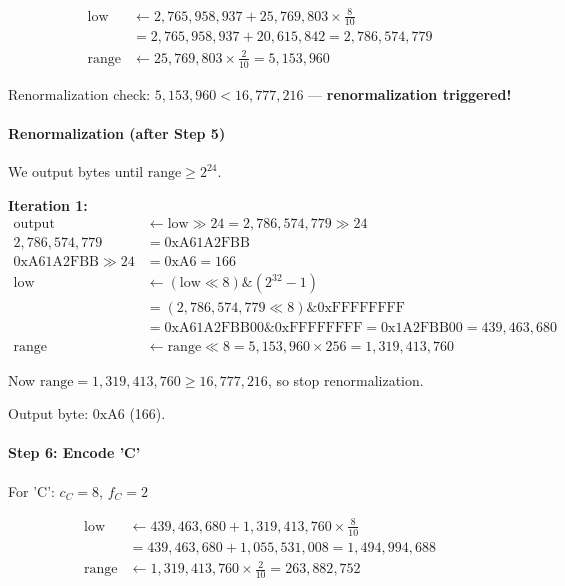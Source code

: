 \[
\begin{aligned}
\text{low} &\gets 2{,}765{,}958{,}937 + 25{,}769{,}803 \times \frac{8}{10} \\
&= 2{,}765{,}958{,}937 + 20{,}615{,}842 = 2{,}786{,}574{,}779 \\
\text{range} &\gets 25{,}769{,}803 \times \frac{2}{10} = 5{,}153{,}960
\end{aligned}
\]

Renormalization check: $5{,}153{,}960 < 16{,}777{,}216$ — \textbf{renormalization triggered!}

\paragraph{Renormalization (after Step 5)}

We output bytes until $\text{range} \ge 2^{24}$.

\textbf{Iteration 1:}
\[
\begin{aligned}
\text{output} &\gets \text{low} \gg 24 = 2{,}786{,}574{,}779 \gg 24 \\
2{,}786{,}574{,}779 &= 0\text{xA61A2FBB} \\
0\text{xA61A2FBB} \gg 24 &= 0\text{xA6} = 166 \\
\text{low} &\gets (\text{low} \ll 8) \mathrel{\&} (2^{32}-1) \\
&= (2{,}786{,}574{,}779 \ll 8) \mathrel{\&} 0\text{xFFFFFFFF} \\
&= 0\text{xA61A2FBB00} \mathrel{\&} 0\text{xFFFFFFFF} = 0\text{x1A2FBB00} = 439{,}463{,}680 \\
\text{range} &\gets \text{range} \ll 8 = 5{,}153{,}960 \times 256 = 1{,}319{,}413{,}760
\end{aligned}
\]

Now $\text{range} = 1{,}319{,}413{,}760 \ge 16{,}777{,}216$, so stop renormalization.

Output byte: $\text{0xA6}$ (166).

\paragraph{Step 6: Encode 'C'}

For 'C': $c_C = 8$, $f_C = 2$

\[
\begin{aligned}
\text{low} &\gets 439{,}463{,}680 + 1{,}319{,}413{,}760 \times \frac{8}{10} \\
&= 439{,}463{,}680 + 1{,}055{,}531{,}008 = 1{,}494{,}994{,}688 \\
\text{range} &\gets 1{,}319{,}413{,}760 \times \frac{2}{10} = 263{,}882{,}752
\end{aligned}
\]

